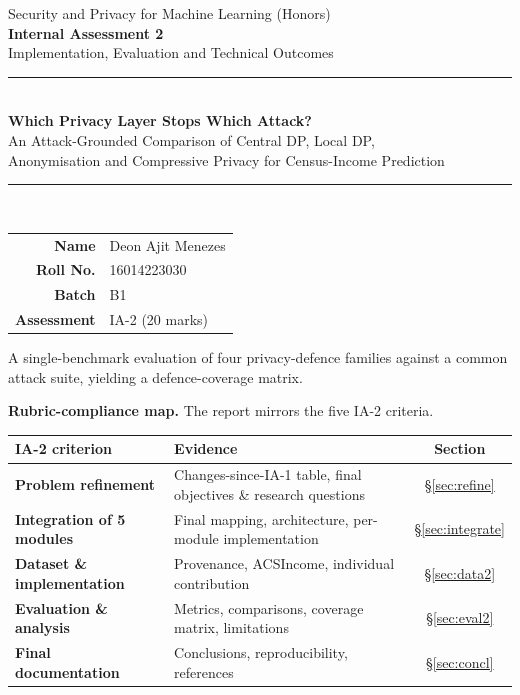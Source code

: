 \documentclass[11pt,a4paper]{article}
\begin{document}
\begin{titlepage}
\centering
\vspace*{1.2cm}
{\large Security and Privacy for Machine Learning (Honors)}\\[0.3cm]
{\large\bfseries Internal Assessment 2}\\[0.2cm]
{\normalsize Implementation, Evaluation and Technical Outcomes}\\[1.6cm]
\rule{\textwidth}{0.4pt}\\[0.5cm]
{\LARGE\bfseries Which Privacy Layer Stops Which Attack?}\\[0.4cm]
{\large An Attack-Grounded Comparison of Central DP, Local DP,\\
Anonymisation and Compressive Privacy for Census-Income Prediction}\\[0.5cm]
\rule{\textwidth}{0.4pt}\\[2.2cm]
\begin{tabular}{rl}
\textbf{Name} & Deon Ajit Menezes\\[4pt]
\textbf{Roll No.} & 16014223030\\[4pt]
\textbf{Batch} & B1\\[4pt]
\textbf{Assessment} & IA-2 (20 marks)\\
\end{tabular}
\vfill
{\small A single-benchmark evaluation of four privacy-defence families against a
common attack suite, yielding a defence-coverage matrix.}
\end{titlepage}

\tableofcontents
\vspace{0.5cm}

\begin{shaded}
\noindent\textbf{Rubric-compliance map.} The report mirrors the five IA-2 criteria.
\end{shaded}
\begin{center}\small
\begin{tabularx}{\textwidth}{>{\bfseries}p{3.4cm}Yc}
\toprule
IA-2 criterion & Evidence & Section\\
\midrule
Problem refinement & Changes-since-IA-1 table, final objectives \& research questions & \S\ref{sec:refine}\\
Integration of 5 modules & Final mapping, architecture, per-module implementation & \S\ref{sec:integrate}\\
Dataset \& implementation & Provenance, ACSIncome, individual contribution & \S\ref{sec:data2}\\
Evaluation \& analysis & Metrics, comparisons, coverage matrix, limitations & \S\ref{sec:eval2}\\
Final documentation & Conclusions, reproducibility, references & \S\ref{sec:concl}\\
\bottomrule
\end{tabularx}
\end{center}
\end{document}
